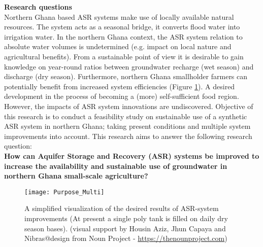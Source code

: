 \textbf{Research questions} \\
Northern Ghana based ASR systems make use of locally available natural resources. The system acts as a seasonal bridge, it converts flood water into irrigation water. In the northern Ghana context, the ASR system relation to absolute water volumes is undetermined (e.g. impact on local nature and agricultural benefits). From a sustainable point of view it is desirable to gain knowledge on year-round ratios between groundwater recharge (wet season) and discharge (dry season). Furthermore, northern Ghana smallholder farmers can potentially benefit from increased system efficiencies (Figure \ref{fig:Purpose_Multi}). A desired development in the process of becoming a (more) self-sufficient food region. However, the impacts of ASR system innovations are undiscovered. Objective of this research is to conduct a feasibility study on sustainable use of a synthetic ASR system in northern Ghana; taking present conditions and multiple system improvements into account. This research aims to answer the following research question: \\

%



\textbf{How can Aquifer Storage and Recovery (ASR) systems be improved to increase the availability and sustainable use of groundwater in northern Ghana small-scale agriculture?} \\

\begin{figure}[h]
 \centering\texttt{[image: Purpose\_Multi]}
 \captionsetup{justification=centering}
 \caption[A simplified visualization of the desired results of ASR-system improvements]{A simplified visualization of the desired results of ASR-system improvements (At present a single poly tank is filled on daily dry season bases). (visual support by Housin Aziz, Jhun Capaya and Nibras@design from Noun Project - \url{https://thenounproject.com})}
 \label{fig:Purpose_Multi}
\end{figure}

